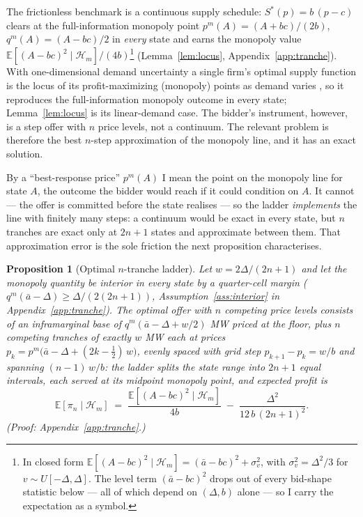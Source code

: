 \documentclass[11pt,a4paper]{article}
\newtheorem{proposition}{Proposition}
\theoremstyle{definition}
\theoremstyle{remark}
\theoremstyle{plain}
\begin{document}
The frictionless benchmark is a continuous supply schedule: $S^*(p) = b\,(p - c)$ clears at the full-information monopoly point $p^m(A) = (A + bc)/(2b)$, $q^m(A) = (A - bc)/2$ in \emph{every} state and earns the monopoly value $\mathbb{E}[(A - bc)^2 \mid \mathcal{H}_m]/(4b)$\footnote{In closed form $\mathbb{E}[(A - bc)^2 \mid \mathcal{H}_m] = (\bar a - bc)^2 + \sigma_v^2$, with $\sigma_v^2 = \Delta^2/3$ for $v \sim U[-\Delta,\Delta]$. The level term $(\bar a - bc)^2$ drops out of every bid-shape statistic below --- all of which depend on $(\Delta, b)$ alone --- so I carry the expectation as a symbol.} (Lemma~\ref{lem:locus}, Appendix~\ref{app:tranche}). With one-dimensional demand uncertainty a single firm's optimal supply function is the locus of its profit-maximizing (monopoly) points as demand varies \citep[p.~1258]{klemperer_meyer_1989}, so it reproduces the full-information monopoly outcome in every state; Lemma~\ref{lem:locus} is its linear-demand case. The bidder's instrument, however, is a step offer with $n$ price levels, not a continuum. The relevant problem is therefore the best $n$-step approximation of the monopoly line, and it has an exact solution.

By a ``best-response price'' $p^m(A)$ I mean the point on the monopoly line for state $A$, the outcome the bidder would reach if it could condition on $A$. It cannot --- the offer is committed before the state realises --- so the ladder \emph{implements} the line with finitely many steps: a continuum would be exact in every state, but $n$ tranches are exact only at $2n+1$ states and approximate between them. That approximation error is the sole friction the next proposition characterises.

\begin{proposition}[Optimal $n$-tranche ladder]\label{prop:ladder}
Let $w = 2\Delta/(2n+1)$ and let the monopoly quantity be interior in every state by a quarter-cell margin ($q^m(\bar a - \Delta) \ge \Delta/(2(2n+1))$, Assumption~\ref{ass:interior} in Appendix~\ref{app:tranche}). The optimal offer with $n$ competing price levels consists of an inframarginal base of $q^m(\bar a - \Delta + w/2)$ MW priced at the floor, plus $n$ competing tranches of exactly $w$ MW each at prices $p_k = p^m\bigl(\bar a - \Delta + (2k - \tfrac{1}{2})\,w\bigr)$, evenly spaced with grid step $p_{k+1} - p_k = w/b$ and spanning $(n-1)\,w/b$: the ladder splits the state range into $2n+1$ equal intervals, each served at its midpoint monopoly point, and expected profit is
\[
\mathbb{E}[\pi_n \mid \mathcal{H}_m] \;=\; \frac{\mathbb{E}[(A - bc)^2 \mid \mathcal{H}_m]}{4b} \;-\; \frac{\Delta^2}{12\, b\, (2n+1)^2}.
\]
(Proof: Appendix~\ref{app:tranche}.)
\end{proposition}
\end{document}
